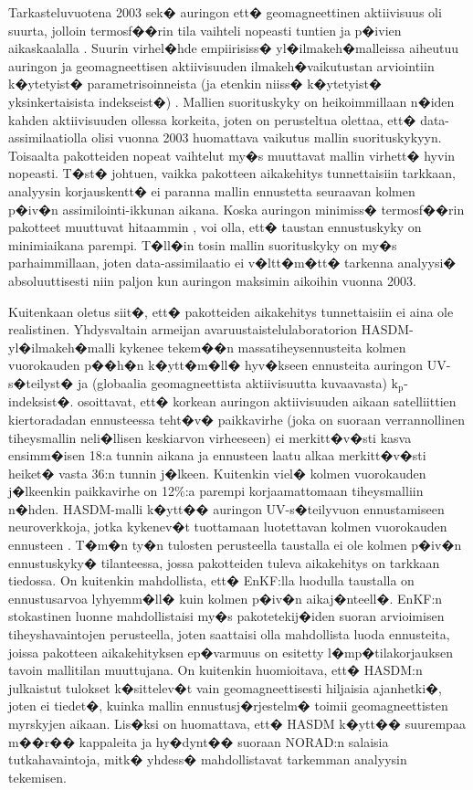 \documentclass[12pt,a4paper,finnish,margin=2in]{article}
\begin{document}
Tarkasteluvuotena 2003 sek� auringon ett� geomagneettinen aktiivisuus oli suurta, jolloin termosf��rin tila vaihteli nopeasti tuntien ja p�ivien aikaskaalalla \citep{emmert_2015}. Suurin virhel�hde empiirisiss� yl�ilmakeh�malleissa aiheutuu auringon ja geomagneettisen aktiivisuuden ilmakeh�vaikutustan arviointiin k�ytetyist� parametrisoinneista (ja etenkin niiss� k�ytetyist� yksinkertaisista indekseist�) \citep{berger_1998}. Mallien suorituskyky on heikoimmillaan n�iden kahden aktiivisuuden ollessa korkeita, joten on perusteltua olettaa, ett� data-assimilaatiolla olisi vuonna 2003 huomattava vaikutus mallin suorituskykyyn. Toisaalta pakotteiden nopeat vaihtelut my�s muuttavat mallin virhett� hyvin nopeasti. T�st� johtuen, vaikka pakotteen aikakehitys tunnettaisiin tarkkaan, analyysin korjauskentt� ei paranna mallin ennustetta seuraavan kolmen p�iv�n assimilointi-ikkunan aikana. Koska auringon minimiss� termosf��rin pakotteet muuttuvat hitaammin \citep{berger_1998}, voi olla, ett� taustan ennustuskyky on minimiaikana parempi. T�ll�in tosin mallin suorituskyky on my�s parhaimmillaan, joten data-assimilaatio ei v�ltt�m�tt� tarkenna analyysi� absoluuttisesti niin paljon kun auringon maksimin aikoihin vuonna 2003.

Kuitenkaan oletus siit�, ett� pakotteiden aikakehitys tunnettaisiin ei aina ole realistinen. Yhdysvaltain armeijan avaruustaistelulaboratorion HASDM-yl�ilmakeh�malli \citep{storz_2005} kykenee tekem��n massatiheysennusteita kolmen vuorokauden p��h�n k�ytt�m�ll� hyv�kseen ennusteita auringon UV-s�teilyst� ja (globaalia geomagneettista aktiivisuutta kuvaavasta) $\mathrm{k_p}$-indeksist�. \citet{storz_2005} osoittavat, ett�  korkean auringon aktiivisuuden aikaan satelliittien kiertoradadan ennusteessa teht�v� paikkavirhe (joka on suoraan verrannollinen tiheysmallin neli�llisen keskiarvon virheeseen) ei merkitt�v�sti kasva ensimm�isen 18:a tunnin aikana ja ennusteen laatu alkaa merkitt�v�sti heiket� vasta 36:n tunnin j�lkeen. Kuitenkin viel� kolmen vuorokauden j�lkeenkin paikkavirhe on 12\%:a parempi korjaamattomaan tiheysmalliin n�hden. HASDM-malli k�ytt�� auringon UV-s�teilyvuon ennustamiseen neuroverkkoja, jotka kykenev�t tuottamaan luotettavan kolmen vuorokauden ennusteen \citep{tobiska_2000}. T�m�n ty�n tulosten perusteella taustalla ei ole kolmen p�iv�n ennustuskyky� tilanteessa, jossa pakotteiden tuleva aikakehitys on tarkkaan tiedossa. On kuitenkin mahdollista, ett� EnKF:lla luodulla taustalla on ennustusarvoa lyhyemm�ll� kuin kolmen p�iv�n aikaj�nteell�. EnKF:n stokastinen luonne mahdollistaisi my�s pakotetekij�iden suoran arvioimisen tiheyshavaintojen perusteella, joten saattaisi olla mahdollista luoda ennusteita, joissa pakotteen aikakehityksen ep�varmuus on esitetty l�mp�tilakorjauksen tavoin mallitilan muuttujana. On kuitenkin huomioitava, ett� HASDM:n julkaistut tulokset k�sittelev�t vain geomagneettisesti hiljaisia ajanhetki�, joten ei tiedet�, kuinka mallin ennustusj�rjestelm� toimii geomagneettisten myrskyjen aikaan. Lis�ksi on huomattava, ett� HASDM k�ytt�� suurempaa m��r�� kappaleita ja hy�dynt�� suoraan NORAD:n salaisia tutkahavaintoja, mitk� yhdess� mahdollistavat tarkemman analyysin tekemisen. 
\end{document}
